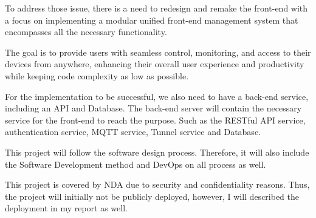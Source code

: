 
To address those issue, there is a need to redesign and remake the front-end with
a focus on implementing a modular unified front-end management system that
encompasses all the necessary functionality. 

The goal is to provide users with seamless control, monitoring, and access to their devices from anywhere, 
enhancing their overall user experience and productivity while keeping code complexity as low as possible.

For the implementation to be successful, we also need to have a back-end
service, including an API and Database. The back-end server will contain the
necessary service for the front-end to reach the purpose. Such as the RESTful
API service, authentication service, MQTT service, Tunnel service and Database.

This project will follow the software design process. Therefore, it will also include
the Software Development method and DevOps on all process as well. 

This project is covered by NDA due to security and confidentiality reasons. Thus, the
project will initially not be publicly deployed, however, I will described the
deployment in my report as well.